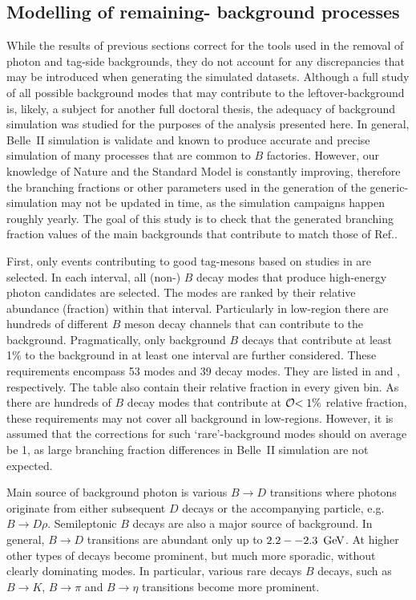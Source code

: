 \subsection{Modelling of remaining-\texorpdfstring{\BB}{BB} background processes}

While the results of previous sections correct for the tools used in the removal of photon and tag-side backgrounds, they do not account for any discrepancies that may be introduced when generating the simulated datasets.
Although a full study of all possible background modes that may contribute to the leftover-\BB background is, likely, a subject for another full doctoral thesis, the adequacy of background simulation was studied for the purposes of the analysis presented here.
In general, Belle~II simulation is validate and known to produce accurate and precise simulation of many processes that are common to $B$ factories.
However, our knowledge of Nature and the Standard Model is constantly improving, therefore the branching fractions or other parameters used in the generation of the generic-\BB simulation may not be updated in time, as the simulation campaigns happen roughly yearly.
The goal of this study is to check that the generated branching fraction values of the main backgrounds that contribute to \BtoXsgamma match those of Ref.\cite{Workman:2022ynf}.

First, only events contributing to good tag-\B mesons based on studies in  are selected.
In each \EB interval, all (non-\BtoXsgamma) $B$ decay modes that produce high-energy photon candidates are selected.
The modes are ranked by their relative abundance (fraction) within that \EB interval.
Particularly in low-\EB region there are hundreds of different $B$ meson decay channels that can contribute to the background.
Pragmatically, only background $B$ decays that contribute at least 1\% to the background in at least one \EB interval are further considered.
These requirements encompass 53 \Bp modes and 39 \Bz decay modes. 
They are listed in  and , respectively.
The table also contain their relative fraction in every given bin.
As there are hundreds of $B$ decay modes that contribute at ${\cal O}{<1\%}$ relative fraction, these requirements may not cover all background in low-\EB regions. 
However, it is assumed that the corrections for such `rare'-background modes should on average be 1, as large branching fraction differences in Belle~II simulation are not expected.

Main source of background photon is various $B\to D$ transitions where photons originate from either subsequent $D$ decays or the accompanying particle, e.g. $B\to D\rho$.
Semileptonic $B$ decays are also a major source of background.
In general, $B\to D$ transitions are abundant only up to $2.2--2.3~\mathrm{\,Ge\kern -0.1em V}$.
At higher \EB other types of decays become prominent, but much more sporadic, without clearly dominating modes.
In particular, various rare decays $B$ decays, such as $B\to K$, $B\to\pi$ and $B\to\eta$ transitions become more prominent.

